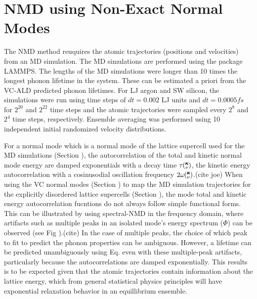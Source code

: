 \documentclass[aps,prb,twocolumn,superscriptaddress,amsmath,amssymb,floatfix]{revtex4}
\newcommand{\kv}{\mspace{-4.0mu}\left(\mspace{-8.0mu}
\begin{smallmatrix}&\pmb{\kappa} \\&\nu\end{smallmatrix}
\mspace{-3.0mu}\right)}
\begin{document}

\section{\label{A:NMD XCORR}
NMD using Non-Exact Normal Modes}

The NMD method reuquires the atomic trajectories (positions and velocities) 
from an MD simulation. 
The MD simulations are performed using the package LAMMPS.
\cite{plimpton_fast_1995} The lengths of the MD simulations were longer 
than 10 times the longest phonon lifetime in the system. These can 
be estimated a priori from the VC-ALD predicted phonon lifetimes. For LJ 
argon and SW silicon, the simulations were run using time steps of 
$dt=0.002$ LJ units and $dt = 0.0005 fs$ for $2^20$ and 
$2^22$ time steps and the atomic trajectories were sampled 
every $2^8$ and $2^4$ time steps, respectively. 
Ensemble averaging was performed using 10 independent initial 
randomized velocity distributions. 

For a normal mode which is a normal mode of the lattice supercell 
used for the MD simulations (Section ), 
the autocorrelation of the total and kinetic     
normal mode energy are damped exponentials 
with a decay time $\tau\kv$, the kinetic energy autocorrelation with a 
cosinusodial oscillation frequency 
$2\omega\kv$.(cite joe) 
When using the VC normal modes (Section ) to map the MD simulation 
trajectories for the explicitly disordered lattice supercells (Section ), 
the mode total and kinetic energy autocorrelation fucntions 
do not always follow simple functional forms. 
This can be illustrated by using spectral-NMD 
in the frequency domain, where artifacts such as 
multiple peaks in an isolated mode's 
energy spectrum ($\Phi$) can be observed (see Fig ).(cite)  
In the case 
of multiple peaks, the choice of which peak to fit to predict the phonon 
properties can be ambiguous.  However, 
a lifetime can be predicted unambiguously using Eq. even with 
these multiple-peak artifacts, particularly because the autocorrelations 
are damped exponentially. This results is to be expected 
given that the atomic trajectories contain 
information about the lattice energy, which from general statistical 
physics principles will have exponential relaxation behavior in an 
equillibrium ensemble.
\cite{srivastava_physics_1990,landau_statistical_1980,
rajabpour_thermal_2010}
\end{document}
